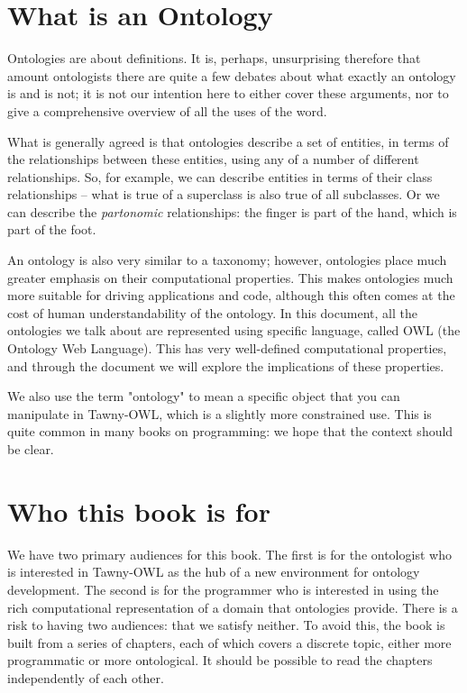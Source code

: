 \section{What is an Ontology}
\label{sec:what-an-ontology}

Ontologies are about definitions. It is, perhaps, unsurprising therefore
that amount ontologists there are quite a few debates about what exactly
an ontology is and is not; it is not our intention here to either cover
these arguments, nor to give a comprehensive overview of all the uses of
the word.

What is generally agreed is that ontologies describe a set of entities,
in terms of the relationships between these entities, using any of a
number of different relationships. So, for example, we can describe
entities in terms of their class relationships -- what is true of a
superclass is also true of all subclasses. Or we can describe the
\emph{partonomic} relationships: the finger is part of the hand, which is
part of the foot.

An ontology is also very similar to a taxonomy; however, ontologies
place much greater emphasis on their computational properties. This
makes ontologies much more suitable for driving applications and code,
although this often comes at the cost of human understandability of the
ontology. In this document, all the ontologies we talk about are
represented using specific language, called OWL (the Ontology Web
Language). This has very well-defined computational properties, and
through the document we will explore the implications of these
properties.

We also use the term "ontology" to mean a specific object that you can
manipulate in Tawny-OWL, which is a slightly more constrained use. This is
quite common in many books on programming: we hope that the context should be
clear.

\section{Who this book is for}
\label{sec:who-this-book}

We have two primary audiences for this book. The first is for the ontologist
who is interested in Tawny-OWL as the hub of a new environment for ontology
development. The second is for the programmer who is interested in using the
rich computational representation of a domain that ontologies provide. There
is a risk to having two audiences: that we satisfy neither. To avoid this, the
book is built from a series of chapters, each of which covers a discrete
topic, either more programmatic or more ontological. It should be possible to
read the chapters independently of each other.

